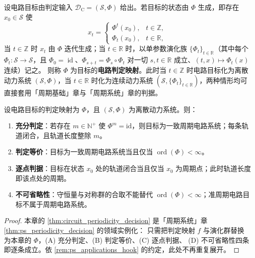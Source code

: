 \begin{definition}[电路判定映射]\label{def:circuit_periodization}
设电路目标由判定输入 $\mathcal D_{\mathrm{C}}=(\mathcal S,\Phi)$ 给出。若目标的状态由 $\Phi$ 生成，即存在 $x_0\in\mathcal S$ 使
\[
x_t=\begin{cases}\Phi^t(x_0), & t\in\mathbb Z,\\ \Phi_t(x_0), & t\in\mathbb R,\end{cases}
\]
当 $t\in\mathbb Z$ 时 $x_t$ 由 $\Phi$ 迭代生成；当 $t\in\mathbb R$ 时，以单参数演化族 $\{\Phi_t\}_{t\in\mathbb R}$（其中每个 $\Phi_t:\mathcal S\to\mathcal S$，且 $\Phi_0=\operatorname{id}$、$\Phi_{s+t}=\Phi_s\circ\Phi_t$ 对一切 $s,t\in\mathbb R$ 成立、$(t,x)\mapsto\Phi_t(x)$ 连续）记之。
则称 $\Phi$ 为目标的\textbf{电路判定映射}。此时当 $t\in\mathbb Z$ 时电路目标化为离散动力系统 $(\mathcal S,\Phi)$，当 $t\in\mathbb R$ 时化为连续动力系统 $(\mathcal S,\{\Phi_t\}_{t\in\mathbb R})$，两种情形均可直接套用「周期基础」章与「周期系统」章的判据。
\end{definition}

\begin{theorem}[电路周期性判定定理]\label{thm:circuit_periodicity_decision}
设电路目标的判定映射为 $\Phi$，且 $(\mathcal S,\Phi)$ 为离散动力系统。则：
\begin{enumerate}[label=(\Alph*)]
    \item \textbf{充分判定}：若存在 $m\in\mathbb N^+$ 使 $\Phi^m=\mathrm{id}$，则目标为一致周期电路系统；每条轨道闭合，且轨道长度整除 $m$。
    \item \textbf{判定等价}：目标为一致周期电路系统当且仅当 $\operatorname{ord}(\Phi)<\infty$。
    \item \textbf{逐点判据}：目标在状态 $x_0$ 处的轨道闭合当且仅当 $x_0$ 为周期点；此时轨道长度即该点处的周期。
    \item \textbf{不可省略性}：守恒量与对称群的合取不能替代 $\operatorname{ord}(\Phi)<\infty$；准周期电路目标不属于周期电路系统。
\end{enumerate}
\end{theorem}

\begin{proof}
本章的 \cref{thm:circuit_periodicity_decision} 是「周期系统」章 \cref{thm:ps_periodicity_decision} 的领域实例化：
只需把判定映射 $f$ 与演化群替换为本章的 $\Phi$，(A) 充分判定、(B) 判定等价、(C) 逐点判据、
(D) 不可省略性四条即逐条成立。依 \cref{rem:ps_applications_hook} 的约定，此处不再重复展开。
\end{proof}


